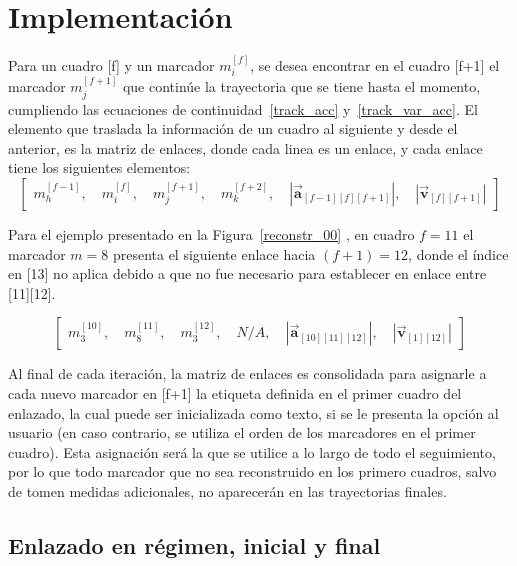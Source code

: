 \section{Implementación}

Para un cuadro [f] y un marcador $m_{i}^{[f]}$, se desea encontrar en el cuadro [f+1] el marcador $m_{j}^{[f+1]}$ que continúe la trayectoria que se tiene hasta el momento, cumpliendo las ecuaciones de continuidad~\ref{track_acc} y~\ref{track_var_acc}. El elemento que traslada la información de un cuadro al siguiente y desde el anterior, es la matriz de enlaces, donde cada linea es un enlace, y cada enlace tiene los siguientes elementos:
\begin{equation}
\begin{bmatrix}
  m_{h}^{[f-1]} ,\quad m_{i}^{[f]} ,\quad m_{j}^{[f+1]} ,\quad m_{k}^{[f+2]} ,\quad \left|\boldsymbol{\overrightarrow{a}}_{[f-1][f][f+1]}\right| ,\quad \left|\boldsymbol{\overrightarrow{v}}_{[f][f+1]}\right|
\end{bmatrix}
\end{equation}

Para el ejemplo presentado en la Figura~\ref{reconstr_00} , en cuadro $f=11$ el marcador $m=8$ presenta el siguiente enlace hacia $(f+1)=12$, donde el índice en [13] no aplica debido a que no fue necesario para establecer en enlace entre [11][12].

\begin{equation}
\begin{bmatrix}
  m_{3}^{[10]} ,\quad m_{8}^{[11]} ,\quad m_{3}^{[12]} ,\quad N/A ,\quad \left|\boldsymbol{\overrightarrow{a}}_{[10][11][12]}\right| ,\quad \left|\boldsymbol{\overrightarrow{v}}_{[1][12]}\right|
\end{bmatrix}
\end{equation}

Al final de cada iteración, la matriz de enlaces es consolidada para asignarle a cada nuevo marcador en [f+1] la etiqueta definida en el primer cuadro del enlazado, la cual puede ser inicializada como texto, si se le presenta la opción al usuario (en caso contrario, se utiliza el orden de los marcadores en el primer cuadro). Esta asignación será la que se utilice a lo largo de todo el seguimiento, por lo que todo marcador que no sea reconstruido en los primero cuadros, salvo de tomen medidas adicionales, no aparecerán en las trayectorias finales.

\subsection{Enlazado en régimen, inicial y final}


